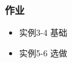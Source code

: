 \documentclass[13pt]{beamer}
\begin{document}
\begin{frame}
\frametitle{作业}
\begin{itemize}
  \item 实例3-4 基础
  \item 实例5-6 选做
\end{itemize}
\end{frame}


% 
% 
% 
% 
\end{document}
